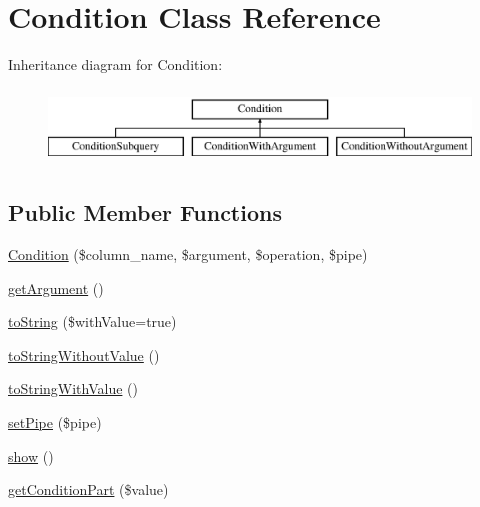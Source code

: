 \hypertarget{classCondition}{}\section{Condition Class Reference}
\label{classCondition}
Inheritance diagram for Condition\+:\begin{figure}[H]
\begin{center}
\leavevmode
\includegraphics[height=2.000000cm]{classCondition}
\end{center}
\end{figure}
\subsection*{Public Member Functions}
\begin{DoxyCompactItemize}
\item 
\hyperlink{classCondition_aaf108d388895d9fe832a52e5586c0ecb}{Condition} (\$column\+\_\+name, \$argument, \$operation, \$pipe)
\item 
\hyperlink{classCondition_a638fb386fab511447a1770d1653936ed}{get\+Argument} ()
\item 
\hyperlink{classCondition_aa4072b1db0e4f4d3a1dae0f1982781e1}{to\+String} (\$with\+Value=true)
\item 
\hyperlink{classCondition_ae472caca5533fe0442eb56fe38cc8ef1}{to\+String\+Without\+Value} ()
\item 
\hyperlink{classCondition_ac15dfd53b971b98fd34b7cfff99ab4c8}{to\+String\+With\+Value} ()
\item 
\hyperlink{classCondition_a5b8810c0b90532ea2bb73561c6d2f986}{set\+Pipe} (\$pipe)
\item 
\hyperlink{classCondition_a72cefb980f256f8c2ae6801e9c8868b9}{show} ()
\item 
\hyperlink{classCondition_a29b59a5ef75db900c012dc5111fb24cf}{get\+Condition\+Part} (\$value)
\end{DoxyCompactItemize}
